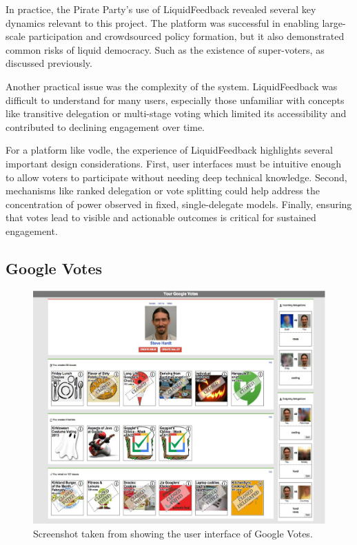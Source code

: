 In practice, the Pirate Party's use of LiquidFeedback revealed several key dynamics relevant to this project. The platform was successful in enabling large-scale participation and crowdsourced policy formation, but it also demonstrated common risks of liquid democracy. Such as the existence of super-voters, as discussed previously.

Another practical issue was the complexity of the system. LiquidFeedback was difficult to understand for many users, especially those unfamiliar with concepts like transitive delegation or multi-stage voting which limited its accessibility and contributed to declining engagement over time.

For a platform like vodle, the experience of LiquidFeedback highlights several important design considerations. First, user interfaces must be intuitive enough to allow voters to participate without needing deep technical knowledge. Second, mechanisms like ranked delegation or vote splitting could help address the concentration of power observed in fixed, single-delegate models. Finally, ensuring that votes lead to visible and actionable outcomes is critical for sustained engagement.

\subsection{Google Votes}
\begin{figure}[h!]
    \centering
    \includegraphics[width=0.8\linewidth]{../common/google_votes.png}
    \caption{Screenshot taken from \cite{hardt_google_2015} showing the user interface of Google Votes.}
\end{figure}

